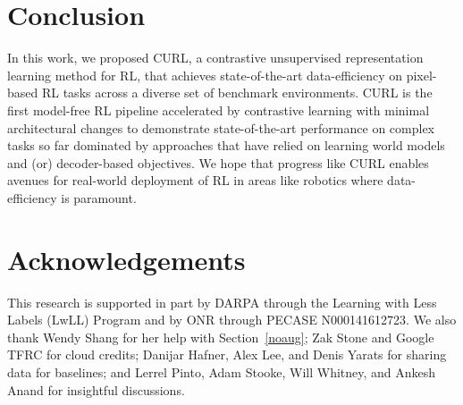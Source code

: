 
\section{Conclusion}

In this work, we proposed CURL, a contrastive unsupervised representation learning method for RL, that achieves state-of-the-art data-efficiency on pixel-based RL tasks across a diverse set of benchmark environments. CURL is the first model-free RL pipeline accelerated by contrastive learning with minimal architectural changes to demonstrate state-of-the-art performance on complex tasks so far dominated by approaches that have relied on learning world models and (or) decoder-based objectives. We hope that progress like CURL enables avenues for real-world deployment of RL in areas like robotics where data-efficiency is paramount.
\section{Acknowledgements} 

This research is supported in part by DARPA through the Learning with Less Labels (LwLL) Program and by ONR through PECASE N000141612723. We also thank Wendy Shang for her help with Section~\ref{noaug}; Zak Stone and Google TFRC for cloud credits; Danijar Hafner, Alex Lee, and Denis Yarats for sharing data for baselines; and Lerrel Pinto, Adam Stooke, Will Whitney, and Ankesh Anand for insightful discussions. 
